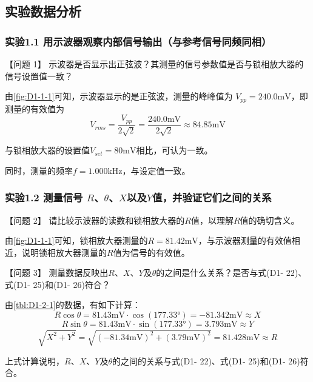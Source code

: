 \documentclass[dvipsnames, svgnames,a4paper,11pt]{article}
\begin{document}
\subsection{实验数据分析}


	\subsubsection*{实验1.1 \quad 用示波器观察内部信号输出（与参考信号同频同相）}
		
		【问题 1】 示波器是否显示出正弦波？其测量的信号参数值是否与锁相放大器的信号设置值一致？

		由\cref{fig:D1-1-1}可知，示波器显示的是正弦波，测量的峰峰值为 $V_{pp} = 240.0 \mathrm{mV}$，即测量的有效值为
		\[
			V_{rms} = \frac{V_{pp}}{2 \sqrt{2}} = \frac{240.0 \mathrm{mV}}{2 \sqrt{2}} \approx 84.85 \mathrm{mV}
		\]

		与锁相放大器的设置值$V_{set} = 80 \mathrm{mV}$相比，可认为一致。

		同时，测量的频率$f = 1.000 \mathrm{kHz}$，与设定值一致。




	\subsubsection*{实验1.2 \quad 测量信号 $R$、$\theta$、$X$以及$Y$值，并验证它们之间的关系}

		【问题 2】 请比较示波器的读数和锁相放大器的$R$值，以理解$R$值的确切含义。

		由\cref{fig:D1-1-1}可知，锁相放大器测量的$R = 81.42 \mathrm{mV}$，与示波器测量的有效值相近，说明锁相放大器测量的$R$值为信号的有效值。


		\vspace{0.05\textwidth} %


		【问题 3】 测量数据反映出$R$、$X$、$Y$及$\theta$的之间是什么关系？是否与式(D1- 22)、式(D1- 25)和(D1- 26)符合？

		由\cref{tbl:D1-2-1}的数据，有如下计算：
		\[
			R \cos\theta = 81.43 \mathrm{mV} \cdot \cos(177.33°) = -81.342 \mathrm{mV} \approx X 
		\]
		\[
			R \sin\theta = 81.43 \mathrm{mV} \cdot \sin(177.33°) = 3.793 \mathrm{mV} \approx Y 
		\]
		\[
			\sqrt{X^2 + Y^2} = \sqrt{(-81.34 \mathrm{mV})^2 + (3.79 \mathrm{mV})^2} = 81.428 \mathrm{mV} \approx R
		\]

		上式计算说明，$R$、$X$、$Y$及$\theta$的之间的关系与式(D1- 22)、式(D1- 25)和(D1- 26)符合。


		\vspace{0.05\textwidth} %
\end{document}
